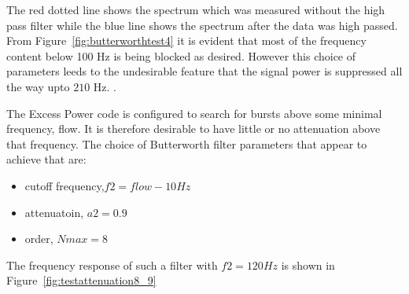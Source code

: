 The red dotted line shows the spectrum which was measured without
the high pass filter while the blue line shows the spectrum after the data was 
high passed. From Figure~\ref{fig:butterworthtest4} 
it is evident that most of the frequency content below 100 Hz is being
blocked as desired. However this choice of parameters leeds to the 
undesirable feature that the signal power is suppressed all the way upto
$210$ Hz.                                         . 

The Excess Power code is configured to search for bursts above some 
minimal frequency, flow. It is therefore desirable to have little
or no attenuation above that frequency. The choice of Butterworth filter 
parameters that appear to achieve that are: 
\begin{itemize}
\item cutoff frequency,$f2 = flow - 10 Hz$
\item attenuatoin, $a2 = 0.9$
\item order, $Nmax = 8$
\end{itemize}
The frequency response of such a filter with $f2 = 120 Hz$ is shown in
Figure~\ref{fig:testattenuation8_9} 
